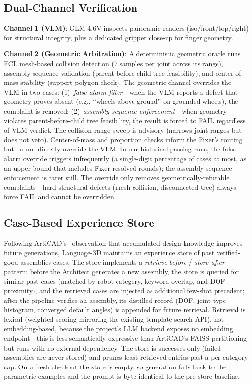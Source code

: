 \documentclass[conference]{IEEEtran}
\begin{document}
\subsection{Dual-Channel Verification}
\textbf{Channel 1 (VLM)}: GLM-4.6V inspects panoramic renders (iso/front/top/right) for structural integrity, plus a dedicated gripper close-up for finger geometry.

\textbf{Channel 2 (Geometric Arbitration)}: A deterministic geometric oracle runs FCL mesh-based collision detection (7 samples per joint across its range), assembly-sequence validation (parent-before-child tree feasibility), and center-of-mass stability (support polygon check). The geometric channel overrides the VLM in two cases: (1)~\emph{false-alarm filter}---when the VLM reports a defect that geometry proves absent (e.g., ``wheels above ground'' on grounded wheels), the complaint is removed; (2)~\emph{assembly-sequence enforcement}---when geometry violates parent-before-child tree feasibility, the result is forced to FAIL regardless of VLM verdict. The collision-range sweep is advisory (narrows joint ranges but does not veto). Center-of-mass and proportion checks inform the Fixer's routing but do not directly override the VLM. In our historical passing runs, the false-alarm override triggers infrequently (a single-digit percentage of cases at most, as an upper bound that includes Fixer-resolved rounds); the assembly-sequence enforcement is rarer still. The override only removes geometrically-refutable complaints---hard structural defects (mesh collision, disconnected tree) always force FAIL and cannot be overridden.

\subsection{Case-Based Experience Store}
Following ArtiCAD's~\cite{articad2026} observation that accumulated design knowledge improves future generations, Language-3D maintains an experience store of past verified-good assemblies cases. The store implements a \emph{retrieve-before} / \emph{store-after} pattern: before the Architect generates a new assembly, the store is queried for similar past cases (matched by robot category, keyword overlap, and DOF proximity), and the retrieved cases are injected as additional few-shot precedent; after the pipeline verifies an assembly, its distilled record (DOF, joint-type histogram, converged default angles) is appended for future retrieval. Retrieval is lexical (weighted scoring mirroring the existing template-search API), not embedding-based, because the project's LLM backend exposes no embedding endpoint---this is less semantically expressive than ArtiCAD's FAISS partitioning but runs with no external dependency. The store is successes-only (failed assemblies are never stored) and prunes least-retrieved entries past a per-category cap. On a fresh checkout the store is empty, so generation falls back to the parametric examples and the prompt is byte-identical to the pre-store baseline.
\end{document}

